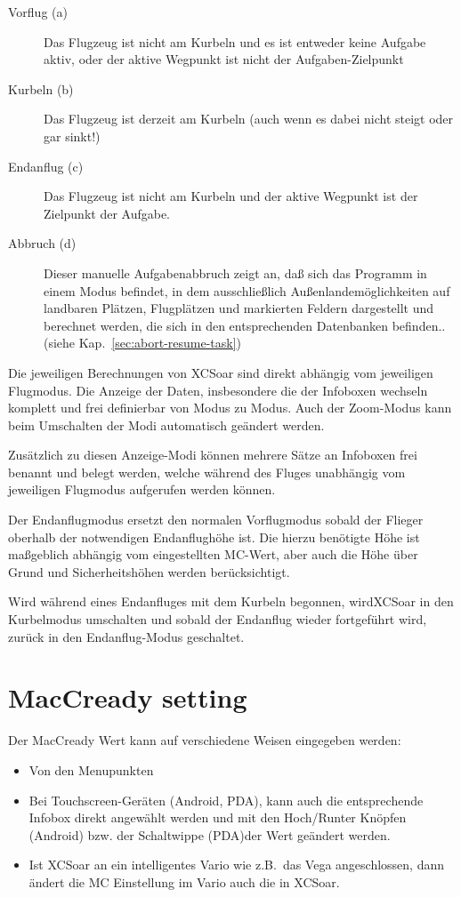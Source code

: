 \begin{description}
\item[Vorflug (a)]   Das Flugzeug ist nicht am Kurbeln  und es ist entweder keine Aufgabe aktiv, oder
der aktive Wegpunkt ist nicht der Aufgaben-Zielpunkt
\item[Kurbeln (b)]  Das Flugzeug ist derzeit am Kurbeln (auch wenn es dabei nicht steigt oder gar sinkt!)
\item[Endanflug (c)]  Das Flugzeug ist nicht am Kurbeln und der aktive Wegpunkt ist der Zielpunkt der Aufgabe.
\item[Abbruch (d)]  Dieser manuelle Aufgabenabbruch zeigt an, daß sich das Programm in einem  Modus befindet, in dem ausschließlich Außenlandemöglichkeiten auf landbaren Plätzen, Flugplätzen und markierten Feldern  dargestellt und berechnet werden, die sich in den entsprechenden Datenbanken befinden.. 
(siehe Kap.~\ref{sec:abort-resume-task})
\end{description}

Die jeweiligen Berechnungen von \textsf{XCSoar} sind direkt abhängig vom jeweiligen Flugmodus. Die
Anzeige der Daten, insbesondere die der Infoboxen wechseln komplett und frei definierbar von Modus zu
Modus. Auch der Zoom-Modus kann beim Umschalten der Modi automatisch geändert werden.

Zusätzlich zu diesen Anzeige-Modi können mehrere Sätze an Infoboxen frei benannt und belegt werden,
welche während des Fluges unabhängig vom jeweiligen Flugmodus aufgerufen werden können.

Der Endanflugmodus ersetzt den normalen Vorflugmodus sobald der Flieger oberhalb der notwendigen
Endanflughöhe ist. Die hierzu benötigte Höhe ist maßgeblich abhängig vom eingestellten MC-Wert, aber
auch die Höhe über Grund und Sicherheitshöhen werden berücksichtigt.

Wird während eines Endanfluges mit dem Kurbeln begonnen, wird\textsf{XCSoar} in den Kurbelmodus umschalten und
sobald der Endanflug wieder fortgeführt wird, zurück in den Endanflug-Modus geschaltet.

\section{MacCready setting}

Der  MacCready Wert kann auf verschiedene Weisen eingegeben werden:
\begin{itemize}
\item Von den Menupunkten
\begin{quote}
\blink{}

\blink{}
\end{quote}
\item Bei  Touchscreen-Geräten (Android, PDA), kann auch die entsprechende Infobox direkt angewählt
werden und mit den Hoch/Runter Knöpfen (Android) bzw. der Schaltwippe (PDA)der Wert geändert werden.
\item Ist \textsf{XCSoar} an ein intelligentes Vario wie z.B.\ das Vega angeschlossen, dann
ändert die MC Einstellung im Vario auch die in \textsf{XCSoar}.
\end{itemize}

